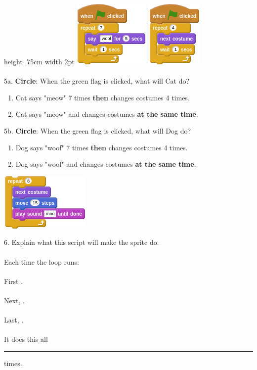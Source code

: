 \documentclass[letterpaper,12pt]{article}
\begin{document}
 \vline height .75cm width 2pt \hspace{1cm}
\includegraphics[scale=.7, valign=t]{q5_script1.png} \hspace{1cm}
\includegraphics[scale=.7, valign=t]{q5_script2.png} \\ \\

\noindent 5a. \textbf{Circle}: When the green flag is clicked, what will Cat do?
\renewcommand{\theenumi}{\Alph{enumi}}
\begin{enumerate}
\item Cat says "meow" 7 times \textbf{then} changes costumes 4 times.
\item Cat says "meow" and changes costumes \textbf{at the same time}. \\
\end{enumerate}

\noindent 5b. \textbf{Circle}: When the green flag is clicked, what will Dog do?
\renewcommand{\theenumi}{\Alph{enumi}}
\begin{enumerate}
\item Dog says "woof" 7 times \textbf{then} changes costumes 4 times.
\item Dog says "woof" and changes costumes \textbf{at the same time}. \\
\end{enumerate}

\newpage


\begin{center}
\includegraphics[scale=.7]{q6_script0.png}
\end{center}
6. Explain what this script will make the sprite do. \\ \\
Each time the loop runs: \\ \\
\indent First \hrulefill. \\ \\
\indent Next, \hrulefill. \\ \\
\indent Last, \hrulefill. \\ \\
It does this all \rule{1cm}{0.5pt} times.
\end{document}
